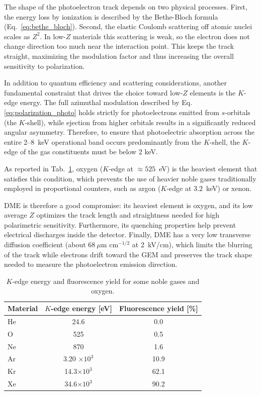 The shape of the photoelectron track depends on two physical processes. First, the energy loss by ionization is described by the Bethe-Bloch formula (Eq.~\ref{eq:bethe_bloch}). Second, the elastic Coulomb scattering off atomic nuclei scales as $Z^2$. In low-$Z$ materials this scattering is weak, so the electron does not change direction too much near the interaction point. This keeps the track straight, maximizing the modulation factor and thus increasing the overall sensitivity to polarization.

In addition to quantum efficiency and scattering considerations, another fundamental constraint that drives the choice toward low-$Z$ elements is the $K$-edge energy. The full azimuthal modulation described by Eq. \ref{eq:polarization_photo} holds strictly for photoelectrons emitted from $s$-orbitals (the $K$-shell), while ejection from higher orbitals results in a significantly reduced angular asymmetry. Therefore, to ensure that photoelectric absorption across the entire 2--8~keV operational band occurs predominantly from the $K$-shell, the $K$-edge of the gas constituents must be below 2 keV.

As reported in Tab.~\ref{tab:k_edge}, oxygen ($K$-edge at $\approx 525$~eV) is the heaviest element that satisfies this condition, which prevents the use of heavier noble gases traditionally employed in proportional counters, such as argon ($K$-edge at $3.2$~keV) or xenon.

DME is therefore a good compromise: its heaviest element is oxygen, and its low average $Z$ optimizes the track length and straightness needed for high polarimetric sensitivity. Furthermore, its quenching properties help prevent electrical discharges inside the detector. Finally, DME has a very low transverse diffusion coefficient (about $68~\mu\text{m cm}^{-1/2}$ at 2~kV/cm), which limits the blurring of the track while electrons drift toward the GEM and preserves the track shape needed to measure the photoelectron emission direction.

\begin{table}[hbtp]
\centering
\small
\begin{tabularx}{\textwidth}{X c c}
Material & $K$-edge energy [eV] & Fluorescence yield [\%]\\
\toprule
He & 24.6 & 0.0 \\
O & 525 & 0.5 \\
Ne & 870 & 1.6 \\
Ar & 3.20 $\times 10^3$ & 10.9\\
Kr & 14.3$\times 10^3$& 62.1\\
Xe & 34.6$\times 10^3$& 90.2\\
\bottomrule
\end{tabularx}
\caption{$K$-edge energy and fluorescence yield for some noble gases and oxygen.}
\label{tab:k_edge}
\end{table}


